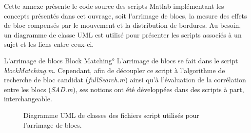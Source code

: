 Cette annexe présente le code source des scripts Matlab implémentant les
concepts présentés dans cet ouvrage, soit l'arrimage de blocs, la mesure des
effets de bloc compensés par le mouvement et la distribution de bordures. Au
besoin, un diagramme de classe UML est utilisé pour présenter les scripts
associés à un sujet et les liens entre ceux-ci.

\begin{section}{L'arrimage de blocs \ang{Block Matching}}
L'arrimage de blocs se fait dans le script \textit{blockMatching.m}. Cependant,
afin de découpler ce script à l'algorithme de recherche de bloc candidat
(\textit{fullSearch.m}) ainsi qu'à l'évaluation de la corrélation entre les
blocs (\textit{SAD.m}), ses notions ont été développées dans des scripts à part,
interchangeable.

\begin{figure}
	\caption{Diagramme UML de classes des fichiers script utilisés pour l'arrimage
	de blocs.}
	\label{fig-BlockMatchingUML}
\end{figure}

\newpage


\newpage



\FloatBarrier
\end{section}

